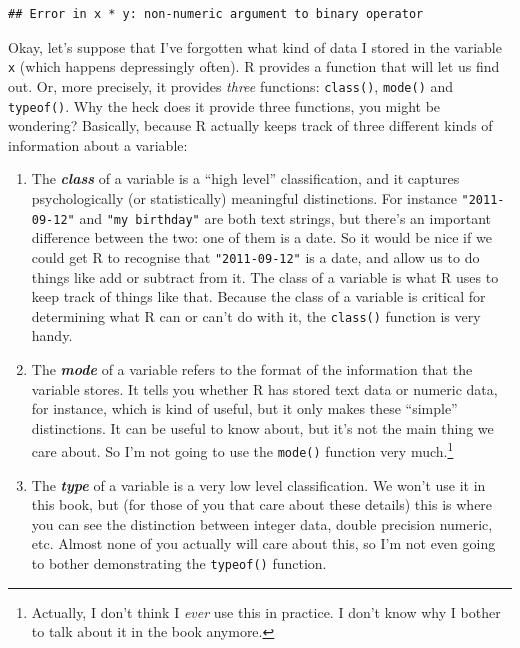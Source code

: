 \documentclass[
]{book}
\providecommand{\tightlist}{%
  \setlength{\itemsep}{0pt}\setlength{\parskip}{0pt}}
\begin{document}
\begin{verbatim}
## Error in x * y: non-numeric argument to binary operator
\end{verbatim}

Okay, let's suppose that I've forgotten what kind of data I stored in the variable \texttt{x} (which happens depressingly often). R provides a function that will let us find out. Or, more precisely, it provides \emph{three} functions: \texttt{class()}, \texttt{mode()} and \texttt{typeof()}. Why the heck does it provide three functions, you might be wondering? Basically, because R actually keeps track of three different kinds of information about a variable:

\begin{enumerate}
\def\labelenumi{\arabic{enumi}.}
\tightlist
\item
  The \textbf{\emph{class}} of a variable is a ``high level'' classification, and it captures psychologically (or statistically) meaningful distinctions. For instance \texttt{"2011-09-12"} and \texttt{"my\ birthday"} are both text strings, but there's an important difference between the two: one of them is a date. So it would be nice if we could get R to recognise that \texttt{"2011-09-12"} is a date, and allow us to do things like add or subtract from it. The class of a variable is what R uses to keep track of things like that. Because the class of a variable is critical for determining what R can or can't do with it, the \texttt{class()} function is very handy.
\item
  The \textbf{\emph{mode}} of a variable refers to the format of the information that the variable stores. It tells you whether R has stored text data or numeric data, for instance, which is kind of useful, but it only makes these ``simple'' distinctions. It can be useful to know about, but it's not the main thing we care about. So I'm not going to use the \texttt{mode()} function very much.\footnote{Actually, I don't think I \emph{ever} use this in practice. I don't know why I bother to talk about it in the book anymore.}
\item
  The \textbf{\emph{type}} of a variable is a very low level classification. We won't use it in this book, but (for those of you that care about these details) this is where you can see the distinction between integer data, double precision numeric, etc. Almost none of you actually will care about this, so I'm not even going to bother demonstrating the \texttt{typeof()} function.
\end{enumerate}
\end{document}
